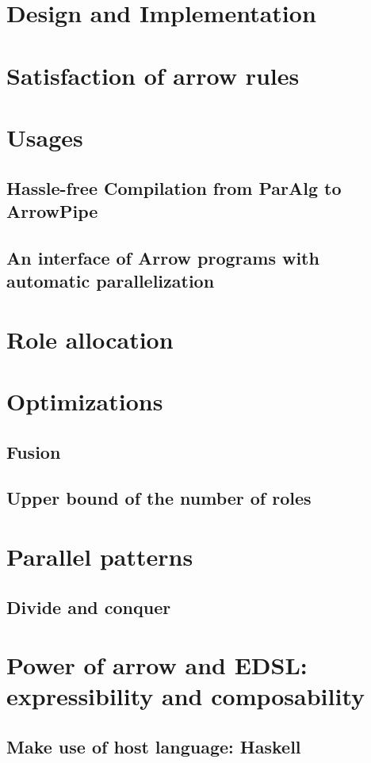 \documentclass[a4paper, twoside]{report}
\begin{document}
\section{Design and Implementation}
\section{Satisfaction of arrow rules}
\section{Usages}
\subsection{Hassle-free Compilation from ParAlg to ArrowPipe} %
\subsection{An interface of Arrow programs with automatic parallelization}
\section{Role allocation}
\section{Optimizations}
\subsection{Fusion}
\subsection{Upper bound of the number of roles}
\section{Parallel patterns}
\subsection{Divide and conquer}
\section{Power of arrow and EDSL: expressibility and composability}
\subsection{Make use of host language: Haskell}
\end{document}
